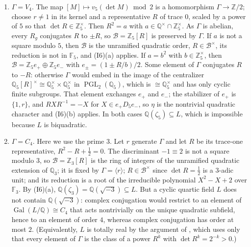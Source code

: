 \documentclass[11pt]{article}
\newcommand{\Q}{\mathbb Q}
\newcommand{\Z}{\mathbb Z}
\newcommand{\F}{\mathbb F}
\DeclareMathOperator{\Gal}{Gal}
\DeclareMathOperator{\PGL}{PGL}
\begin{document}
\begin{enumerate}
\item[(iv)] \(\Gamma=V_4\). The map \([M]\mapsto v_5(\det M)\bmod2\) is a homomorphism
\(\Gamma\to\Z/2\); choose \(r\neq1\) in its kernel and a representative \(R\) of trace \(0\),
scaled by a power of \(5\) so that \(\det R\in\Z_5^\times\). Then \(R^2=a\) with
\(a\in\Q^\times\cap\Z_5^\times\). As \(\Gamma\) is abelian, every \(R_g\) conjugates \(R\) to
\(\pm R\), so \(\mathcal B=\Z_5[R]\) is preserved by \(\Gamma\). If \(a\) is not a square modulo
\(5\), then \(\mathcal B\) is the unramified quadratic order, \(R\in\mathcal B^\times\), its reduction
is not in \(\F_5\), and (I6)(a) applies. If \(a=b^2\) with \(b\in\Z_5^\times\), then
\(\mathcal B=\Z_5e_+\oplus\Z_5e_-\) with \(e_\pm=(1\pm R/b)/2\). Some element of \(\Gamma\) conjugates
\(R\) to \(-R\): otherwise \(\Gamma\) would embed in the image of the centralizer
\(\Q_5[R]^\times\cong\Q_5^\times\times\Q_5^\times\) in \(\PGL_2(\Q_5)\), which is
\(\cong\Q_5^\times\) and has only cyclic finite subgroups. That element exchanges \(e_+\) and \(e_-\);
the stabilizer of \(e_+\) is \(\{1,r\}\), and \(RXR^{-1}=-X\) for \(X\in e_+D_5e_-\), so \(\eta\) is the
nontrivial quadratic character and (I6)(b) applies. In both cases \(\Q(\zeta_5)\subseteq L\), which
is impossible because \(L\) is biquadratic.

\item[(v)] \(\Gamma=C_4\). Here we use the prime \(3\). Let \(r\) generate \(\Gamma\) and let \(R\)
be its trace-one representative, \(R^2-R+\tfrac12=0\). The discriminant \(-1\equiv2\) is not a square
modulo \(3\), so \(\mathcal B=\Z_3[R]\) is the ring of integers of the unramified quadratic extension
of \(\Q_3\); it is fixed by \(\Gamma=\langle r\rangle\); \(R\in\mathcal B^\times\) since
\(\det R=\tfrac12\) is a \(3\)-adic unit; and its reduction is a root of the irreducible polynomial
\(X^2-X+2\) over \(\F_3\). By (I6)(a), \(\Q(\zeta_3)=\Q(\sqrt{-3})\subseteq L\). But a cyclic quartic
field \(L\) does not contain \(\Q(\sqrt{-3})\): complex conjugation would restrict to an element of
\(\Gal(L/\Q)\cong C_4\) that acts nontrivially on the unique quadratic subfield, hence to an element
of order \(4\), whereas complex conjugation has order at most \(2\). (Equivalently, \(L\) is totally
real by the argument of \cite[Section~9.1]{P63}, which uses only that every element of \(\Gamma\) is
the class of a power \(R^k\) with \(\det R^k=2^{-k}>0\).)


\end{enumerate}
\end{document}
